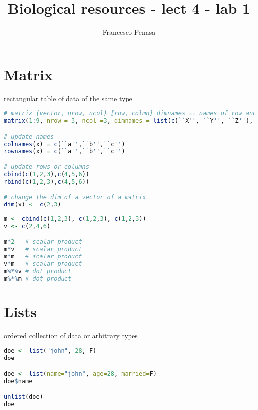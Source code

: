 \documentclass[11pt]{article}
\begin{document}
\author{Francesco Penasa}
\title{Biological resources - lect 4 - lab 1}
\maketitle

\medskip

\section{Matrix} %
rectangular table of data of the same type
\label{sec:matrix}
\begin{lstlisting}[language=R]
# matrix (vector, nrow, ncol) [row, colmn] dimnames == names of row and column
matrix(1:9, nrow = 3, ncol =3, dimnames = list(c(``X'', ``Y'', ``Z''), c(``A'', ``B'', ``C'')))

# update names
colnames(x) = c(``a'',``b'',``c'')
rownames(x) = c(``a'',``b'',``c'')

# update rows or columns
cbind(c(1,2,3),c(4,5,6))
rbind(c(1,2,3),c(4,5,6))

# change the dim of a vector of a matrix
dim(x) <- c(2,3)
\end{lstlisting}


\begin{lstlisting}[language=R]
m <- cbind(c(1,2,3), c(1,2,3), c(1,2,3))
v <- c(2,4,6)

m*2   # scalar product
m*v   # scalar product
m*m   # scalar product
v*m   # scalar product
m%*%v # dot product
m%*%m # dot product
\end{lstlisting}

\section{Lists} %
\label{sec:lists}
ordered collection of data or arbitrary types
\begin{lstlisting}[language=R]
doe <- list("john", 28, F)
doe

doe <- list(name="john", age=28, married=F)
doe$name

unlist(doe)
doe
\end{lstlisting}
\end{document}
